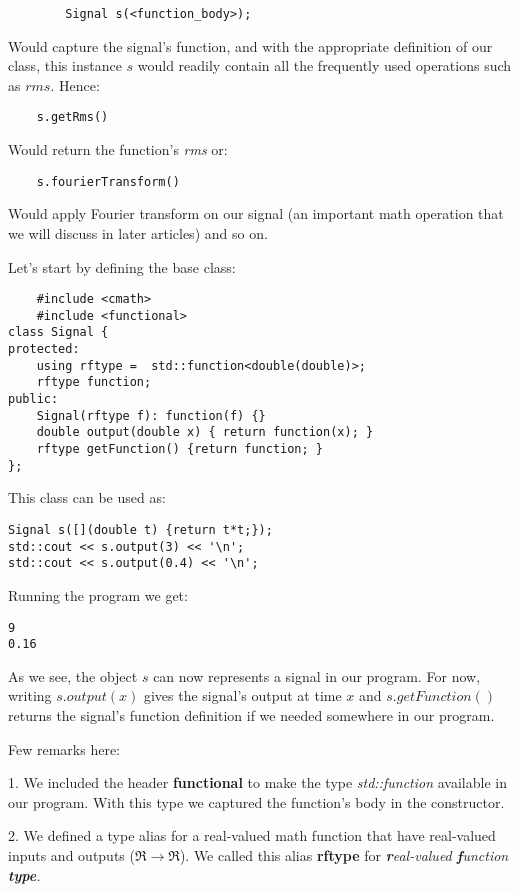 \documentclass{article}
\begin{document}
	\begin{verbatim}
		Signal s(<function_body>);
	\end{verbatim}
	 
	Would capture the signal's function, and with the appropriate definition of our class, this instance $s$ would readily contain all the frequently used operations such as $rms$. Hence:
	
	\begin{verbatim}
	s.getRms()
	\end{verbatim}

	Would return the function's \textit{rms} or:
		
	\begin{verbatim}
	s.fourierTransform()
	\end{verbatim}

	Would apply Fourier transform on our signal (an important math operation that we will discuss in later articles) and so on.
		
	Let's start by defining the base class:
	
	\begin{verbatim}
	#include <cmath>
	#include <functional>
class Signal {
protected:
    using rftype =  std::function<double(double)>;
    rftype function;
public:
    Signal(rftype f): function(f) {}
    double output(double x) { return function(x); }
    rftype getFunction() {return function; }
};
	\end{verbatim}
	This class can be used as:
	
	\begin{verbatim}
Signal s([](double t) {return t*t;});
std::cout << s.output(3) << '\n';
std::cout << s.output(0.4) << '\n';
	\end{verbatim}
	Running the program we get:
	
	\begin{verbatim}
9
0.16
	\end{verbatim}
	
	As we see, the object $s$ can now represents a signal in our program. For now, writing $s.output(x)$ gives the signal's output at time $x$ and $s.getFunction()$ returns the signal's function definition if we needed somewhere in our program.
		
	Few remarks here:
	
	1. We included the header \textbf{functional} to make the type \textit{std::function} available in our program. With this type we captured the function's body in the constructor.

	2. We defined a type alias for a real-valued math function that have real-valued inputs and outputs ($\Re\rightarrow\Re$). We called this alias \textbf{rftype} for \textit{\textbf{r}eal-valued \textbf{f}unction \textbf{type}.}
	
\end{document}
